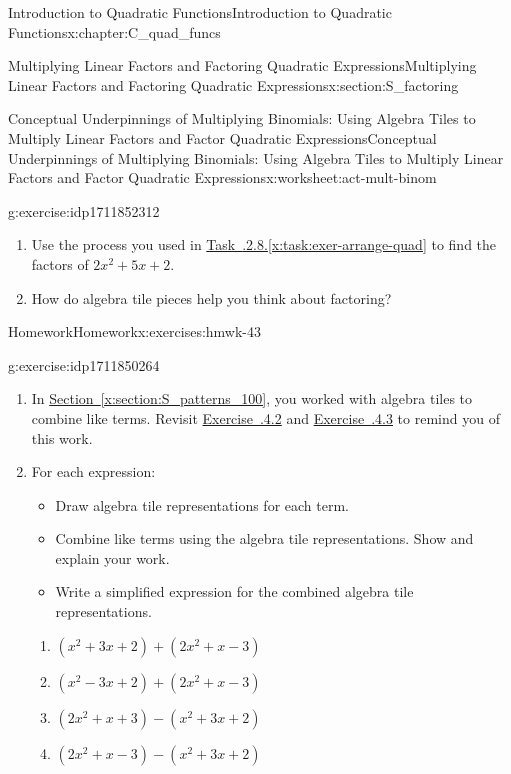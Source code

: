 \documentclass[oneside,10pt,]{book}
\newcommand{\xreffont}{\relax}
\numberwithin{equation}{chapter}
\begin{document}
\begin{chapterptx}{Introduction to Quadratic Functions}{}{Introduction to Quadratic Functions}{}{}{x:chapter:C_quad_funcs}
\begin{sectionptx}{Multiplying Linear Factors and Factoring Quadratic Expressions}{}{Multiplying Linear Factors and Factoring Quadratic Expressions}{}{}{x:section:S_factoring}
\begin{worksheet-subsection}{Conceptual Underpinnings of Multiplying Binomials: Using Algebra Tiles to Multiply Linear Factors and Factor Quadratic Expressions}{}{Conceptual Underpinnings of Multiplying Binomials: Using Algebra Tiles to Multiply Linear Factors and Factor Quadratic Expressions}{}{}{x:worksheet:act-mult-binom}
\begin{divisionexercise}{8}{}{}{g:exercise:idp1711852312}
\begin{enumerate}[font=\bfseries,label=(\alph*),ref=\alph*]
\item{}Use the process you used in \hyperref[x:task:exer-arrange-quad]{Task~{\xreffont 4.3.2.8}.{\xreffont\ref{x:task:exer-arrange-quad}}} to find the factors of \(2x^2 + 5x + 2\).%
\item{}How do algebra tile pieces help you think about factoring?%
\end{enumerate}
\end{divisionexercise}%
\end{worksheet-subsection}
\restoregeometry
%
%
\typeout{************************************************}
\typeout{************************************************}
%
\begin{exercises-subsection}{Homework}{}{Homework}{}{}{x:exercises:hmwk-43}
\begin{divisionexercise}{1}{}{}{g:exercise:idp1711850264}%
\begin{enumerate}[font=\bfseries,label=(\alph*),ref=\alph*]
\item{}In \hyperref[x:section:S_patterns_100]{Section~{\xreffont\ref{x:section:S_patterns_100}}}, you worked with algebra tiles to combine like terms. Revisit \hyperlink{x:exercise:exer-placeholder}{Exercise~{\xreffont 1.6.4.2}} and \hyperlink{x:exercise:exer-like-terms-tiles}{Exercise~{\xreffont 1.6.4.3}} to remind you of this work.%
\item{}For each expression:%
\begin{itemize}[label=\textbullet]
\item{}Draw algebra tile representations for each term.%
\item{}Combine like terms using the algebra tile representations. Show and explain your work.%
\item{}Write a simplified expression for the combined algebra tile representations.%
\end{itemize}
%
\begin{enumerate}[font=\bfseries,label=(\roman*),ref=\theenumi.\roman*]
\item{}\((x^2 + 3x + 2) + (2x^2 + x - 3)\)%
\item{}\((x^2 - 3x + 2) + (2x^2 + x - 3)\)%
\item{}\((2x^2 + x + 3) - (x^2 + 3x + 2)\)%
\item{}\((2x^2 + x - 3) - (x^2 + 3x + 2)\)%
\end{enumerate}
\end{enumerate}
\end{divisionexercise}%

\end{exercises-subsection}
\end{sectionptx}
\end{chapterptx}
\end{document}
